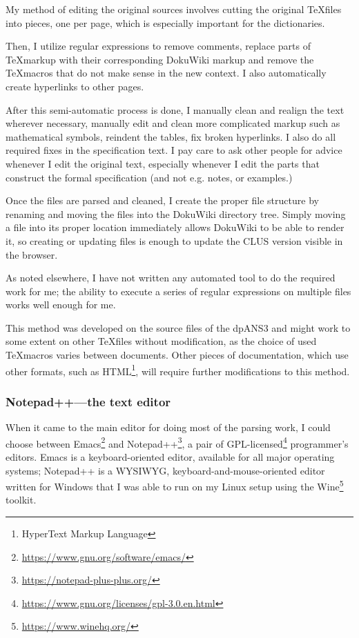 My method of editing the original sources involves cutting the original \TeX files into pieces, one per page, which is especially important for the dictionaries.

Then, I utilize regular expressions to remove comments, replace parts of \TeX markup with their corresponding DokuWiki markup and remove the \TeX macros that do not make sense in the new context. I also automatically create hyperlinks to other pages.

After this semi-automatic process is done, I manually clean and realign the text wherever necessary, manually edit and clean more complicated markup such as mathematical symbols, reindent the tables, fix broken hyperlinks. I also do all required fixes in the specification text. I pay care to ask other people for advice whenever I edit the original text, especially whenever I edit the parts that construct the formal specification (and not e.g. notes, or examples.)

Once the files are parsed and cleaned, I create the proper file structure by renaming and moving the files into the DokuWiki directory tree. Simply moving a file into its proper location immediately allows DokuWiki to be able to render it, so creating or updating files is enough to update the CLUS version visible in the browser.

As noted elsewhere, I have not written any automated tool to do the required work for me; the ability to execute a series of regular expressions on multiple files works well enough for me.

This method was developed on the source files of the dpANS3 and might work to some extent on other \TeX files without modification, as the choice of used \TeX macros varies between documents. Other pieces of documentation, which use other formats, such as HTML\footnote{HyperText Markup Language}, will require further modifications to this method.

\subsubsection{Notepad++---the text editor}

When it came to the main editor for doing most of the parsing work, I could choose between Emacs\footnote{\url{https://www.gnu.org/software/emacs/}} and Note\-pad++\footnote{\url{https://notepad-plus-plus.org/}}, a pair of GPL-licensed\footnote{\url{https://www.gnu.org/licenses/gpl-3.0.en.html}} programmer's editors. Emacs is a keyboard-oriented editor, available for all major operating systems; Notepad++ is a WYSIWYG, keyboard-and-mouse-oriented editor written for Windows that I was able to run on my Linux setup using the Wine\footnote{\url{https://www.winehq.org/}} toolkit.

